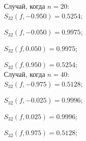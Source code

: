 \documentclass[rus, 12 pt]{article}
\begin{document}
    
    Случай, когда $n=20$:\\

    
    

    
    $S_{32}(f,-0.950)=0.5254$;

    
    $S_{32}(f,-0.050)=0.9975$;

    
    $S_{32}(f,0.050)=0.9975$;

    
    $S_{32}(f,0.950)=0.5254$;\\

    
    

    
    Случай, когда $n=40$:\\

    
    

    
    $S_{32}(f,-0.975)=0.5128$;

    
    $S_{32}(f,-0.025)=0.9996$;

    
    $S_{32}(f,0.025)=0.9996$;

    
    $S_{32}(f,0.975)=0.5128$;\\

    
    

    

    
    
    
\end{document}
